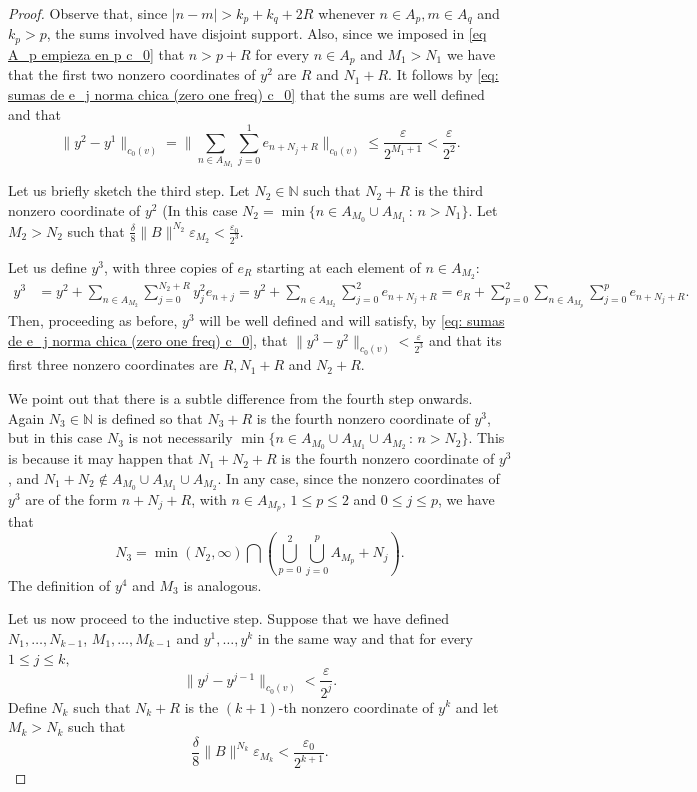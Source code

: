 \documentclass[11pt]{amsart}
\newcommand{\zN}{\mathbb N}
\begin{document}
\begin{proof}
Observe that, since $|n-m|>k_p+k_q+2R$ whenever $n\in A_p,m\in A_q$ and $k_p>p$, the sums involved have disjoint support. Also, since we imposed in \eqref{eq A_p empieza en p c_0} that $n>p+R$ for every $n\in A_p$ and $M_1>N_1$ we have that the first two nonzero coordinates of $y^2$ are $R$ and $N_1+R$.  It follows by \eqref{eq: sumas de e_j norma chica (zero one freq) c_0} that the sums are well defined and that 
$$\|y^2-y^1\|_{c_0(v)}=\|\sum_{n\in A_{M_1}}\sum_{j=0}^1 e_{n+N_j+R}\|_{c_0(v)}\leq  \frac{\varepsilon}{2^{M_1+1}}<\frac{\varepsilon}{2^2}.$$

Let us briefly sketch the third step. Let $N_2\in\zN$ such that $N_2+R$ is the third nonzero coordinate of $y^2$ (In this case $N_2=\min\{n\in A_{M_0}\cup A_{M_1}\,:\, n>N_1\}.$ Let $M_2>N_2$ such that $ \frac{\delta}{8}\|B\|^{N_{2}}\varepsilon_{M_{2}}<\frac{\varepsilon_0}{2^{3}}$.


Let us define $y^3$, with three copies of $e_R$ starting at each element of $n\in A_{M_2}$:
\begin{align*}
y^3&=y^2+\sum_{n\in A_{M_2}}\sum_{j=0}^{N_2+R} y^2_j e_{n+j}    =y^2+\sum_{n\in A_{M_2}} \sum_{j=0}^2  e_{n+N_j+R} =e_R+\sum_{p=0}^{2}\sum_{n\in A_{M_p}}\sum_{j=0}^p e_{n+N_j+R}.
\end{align*}
Then, proceeding as before, $y^3$ will be well defined and will satisfy, by \eqref{eq: sumas de e_j norma chica (zero one freq) c_0}, that $\|y^3-y^2\|_{c_0(v)}<\frac{\varepsilon}{2^3}$ and that its first three nonzero coordinates are $R,N_1+R$ and $N_2+R$.

We point out that there is a subtle difference from the fourth step onwards. Again $N_3\in\zN$ is defined so that $N_3+R$ is the fourth nonzero coordinate of $y^3$, but in this case  $N_3$ is not necessarily $\min\{n\in A_{M_0}\cup A_{M_1}\cup A_{M_2}\,:\, n>N_2\}.$ This is because it may happen that $N_1+N_2+R$ is the fourth nonzero coordinate of $y^3$, and $N_1+N_2\notin A_{M_0}\cup A_{M_1}\cup A_{M_2}$. In any case, since the nonzero coordinates of $y^3$ are of the form $n+N_j+R$, with $n\in A_{M_p}$, $1\leq p\leq 2$ and $0\leq j\leq p$, we have that 
$$N_3=\min(N_2,\infty)\bigcap\left(\bigcup_{p=0}^2\bigcup _{j=0}^p A_{M_p}+N_j\right).$$
The definition of $y^4$ and $M_3$ is analogous.



Let us now proceed to the inductive step. Suppose that we have defined $N_1,\dots, N_{k-1}$, $M_1,\dots,M_{k-1}$ and $y^1,\dots,y^k$ in the same way and that for every  $1\leq j\le k,$
$$
\|y^{j}-y^{j-1}\|_{c_0(v)}<\frac{\varepsilon}{2^{j}}.
$$
Define $N_k$ such that $N_k+R$ is the $(k+1)$-th nonzero coordinate of $y^k$  and let $M_k>N_k$ such that 
\begin{equation}\label{eq: definicion M_k c_0}
    \frac{\delta}{8}\|B\|^{N_{k}} \varepsilon_{M_{k}}<\frac{\varepsilon_0}{2^{k+1}}.
\end{equation}


\end{proof}
\end{document}
